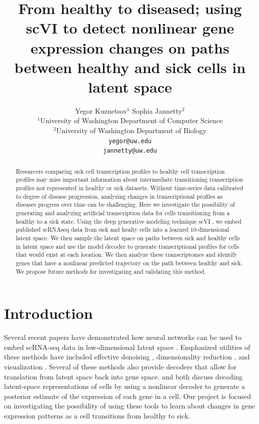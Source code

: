 \documentclass{article}
\title{From healthy to diseased; using scVI to detect nonlinear gene expression changes on paths between healthy and sick cells in latent space}
\author{%
Yegor Kuznetsov$^{1}$ \quad Sophia Jannetty$^{2}$\\
$^1$University of Washington Department of Computer Science\\
$^2$University of Washington Department of Biology\\
\texttt{yegor@uw.edu}\\
\texttt{jannetty@uw.edu}\\
}
\begin{document}
\maketitle


\begin{abstract}
  Researcers comparing sick cell transcription profiles to healthy cell transcription profiles may miss important information about intermediate transitioning transcription profiles not represented in healthy or sick datasets.
  Without time-series data calibrated to degree of disease progression, analyzing changes in transcriptional profiles as diseases progress over time can be challenging.
  Here we investigate the possibility of generating and analyzing artificial transcription data for cells transitioning from a healthy to a sick state.
  Using the deep generative modeling technique scVI \citep{lopez_deep_2018}, we embed published scRNAseq data from sick and healty cells into a learned 10-dimensional latent space.
  We then sample the latent space on paths between sick and healthy cells in latent space and use the model decoder to generate transcriptional profiles for cells that would exist at each location.
  We then analyze these transcriptomes and identify genes that have a nonlinear predicted trajectory on the path between healthy and sick.
  We propose future methods for investigating and validating this method.
\end{abstract}


\section{Introduction}

Several recent papers have demonstrated how neural networks can be used to embed scRNA-seq data in low-dimensional latent space \citep{ding_interpretable_2018,wang_vasc_2018,gronbech_scvae_2018,eraslan_single-cell_2019}.
Emphasized utilities of these methods have included effective denoising \citep{eraslan_single-cell_2019}, dimensionality reduction \citep{wang_vasc_2018,ding_interpretable_2018}, and visualization \citep{wang_vasc_2018}.
Several of these methods also provide decoders that allow for translation from latent space back into gene space.
\citet{gronbech_scvae_2018} and \citet{lopez_deep_2018} both discuss decoding latent-space representations of cells by using a nonlinear decoder to generate a posterior estimate of the expression of each gene in a cell.
Our project is focused on investigating the possibility of using these tools to learn about changes in gene expression patterns as a cell transitions from healthy to sick.
\end{document}
